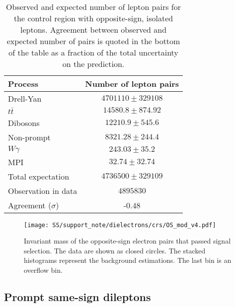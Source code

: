 \begin{table}[htbp]
\begin{center}
\begin{tabular}{l|c}

Process & Number of lepton pairs \\\hline\hline
        Drell-Yan	& $ 4701110 \pm 329108 $	\\[+0.05in]
	$t\bar{t}$	& $ 14580.8 \pm 874.92 $	\\[+0.05in]
	Dibosons	& $ 12210.9 \pm 545.6 $	\\[+0.05in]
	Non-prompt	& $ 8321.28 \pm 244.4 $	\\[+0.05in]
	$W\gamma$	& $ 243.03 \pm 35.2 $	\\[+0.05in]
	MPI	& $ 32.74 \pm 32.74 $	\\[+0.05in]
	\hline
	Total expectation	& $ 4736500 \pm 329109 $	\\[+0.05in]
	\hline
	Observation in data	& $ 4895830 $	\\[+0.05in]
	\hline
	Agreement ($\sigma$) & -0.48 \\[+0.05in]

\hline  
\end{tabular}
\end{center}
\caption{Observed and expected number of lepton pairs for the control region with opposite-sign, isolated leptons.
Agreement between observed and expected number of pairs is quoted in the bottom of the table as a fraction of the total uncertainty on the prediction.
} %
\label{tab:dilep_isoOS}
\end{table}

\begin{figure}[h]
\begin{center}
\texttt{[image: SS/support\_note/dielectrons/crs/OS\_mod\_v4.pdf]}
\caption{Invariant mass of the opposite-sign electron pairs that passed signal selection.
The data are shown as closed circles. The stacked histograms represent the background estimations. 
The last bin is an overflow bin.
}
\label{fig:OS_CR}
\end{center}
\end{figure} 

\subsection{Prompt same-sign dileptons}

